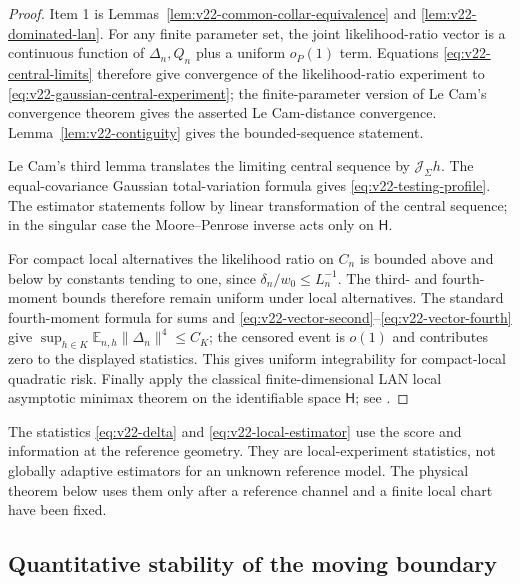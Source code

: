 \begin{proof}
Item 1 is Lemmas~\ref{lem:v22-common-collar-equivalence} and
\ref{lem:v22-dominated-lan}.  For any finite parameter set, the joint
likelihood-ratio vector is a continuous function of $\Delta_n,Q_n$ plus a
uniform $o_P(1)$ term.  Equations \eqref{eq:v22-central-limits} therefore give
convergence of the likelihood-ratio experiment to
\eqref{eq:v22-gaussian-central-experiment}; the finite-parameter version of
Le Cam's convergence theorem gives the asserted Le Cam-distance convergence.
Lemma~\ref{lem:v22-contiguity} gives the bounded-sequence statement.

Le Cam's third lemma translates the limiting central sequence by
$\mathcal J_\Sigma h$.  The equal-covariance Gaussian total-variation formula
gives \eqref{eq:v22-testing-profile}.  The estimator statements follow by
linear transformation of the central sequence; in the singular case the
Moore--Penrose inverse acts only on $\mathsf H$.

For compact local alternatives the likelihood ratio on $C_n$ is bounded above
and below by constants tending to one, since $\delta_n/w_0\le L_n^{-1}$.
The third- and fourth-moment bounds therefore remain uniform under local
alternatives.  The standard fourth-moment formula for sums and
\eqref{eq:v22-vector-second}--\eqref{eq:v22-vector-fourth} give
$\sup_{h\in K}\mathbb E_{n,h}\|\Delta_n\|^4\le C_K$; the censored event is
$o(1)$ and contributes zero to the displayed statistics.  This gives uniform
integrability for compact-local quadratic risk.  Finally apply the classical
finite-dimensional LAN local asymptotic minimax theorem on the identifiable
space $\mathsf H$; see \cite{IbragimovHasminskii,HiranoPorter}.
\end{proof}

\begin{remark}
The statistics \eqref{eq:v22-delta} and \eqref{eq:v22-local-estimator} use the
score and information at the reference geometry.  They are local-experiment
statistics, not globally adaptive estimators for an unknown reference model.
The physical theorem below uses them only after a reference channel and a
finite local chart have been fixed.
\end{remark}

\subsection{Quantitative stability of the moving boundary}

